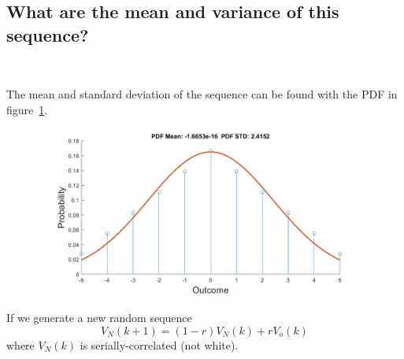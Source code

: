 \documentclass[12pt,letterpaper, onecolumn]{exam}
\begin{document}
\begin{questions}
\begin{parts}
		\part{What are the mean and variance of this sequence?}\\
		\solution
		{The mean and standard deviation of the sequence can be found with the PDF in figure~\ref{fig:Q4_A}.
			\begin{figure}[!h]
				\label{fig:Q4_A}
				\centering
				\includegraphics[width=\linewidth]{Q4_a.png}
			\end{figure}}

		If we generate a new random sequence \[V_N(k+1) = (1 - r)V_N(k) + rV_o(k)\]where $V_N(k)$ is serially-correlated (not white).

\end{parts}
\end{questions}
\end{document}

